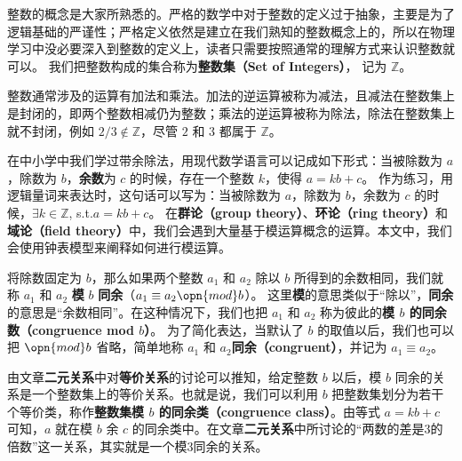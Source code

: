 


整数的概念是大家所熟悉的。严格的数学中对于整数的定义过于抽象，主要是为了逻辑基础的严谨性；严格定义依然是建立在我们熟知的整数概念上的，所以在物理学习中没必要深入到整数的定义上，读者只需要按照通常的理解方式来认识整数就可以。 我们把整数构成的集合称为\textbf{整数集（Set of Integers）}， 记为 $\mathbb{Z}$。

整数通常涉及的运算有加法和乘法。加法的逆运算被称为减法，且减法在整数集上是封闭的，即两个整数相减仍为整数；乘法的逆运算被称为除法，除法在整数集上就不封闭，例如 $2/3\not\in\mathbb{Z}$，尽管 $2$ 和 $3$ 都属于 $\mathbb{Z}$。

在中小学中我们学过带余除法，用现代数学语言可以记成如下形式：当被除数为 $a$，除数为 $b$，\textbf{余数}为 $c$ 的时候，存在一个整数 $k$，使得 $a=kb+c$。 作为练习，用逻辑量词来表达时，这句话可以写为：当被除数为 $a$，除数为 $b$，余数为 $c$ 的时候，$\exists k\in \mathbb{Z}$, s.t.$ a=kb+c$。 在\textbf{群论（group theory）}、\textbf{环论（ring theory）}和\textbf{域论（field theory）}中，我们会遇到大量基于模运算概念的运算。本文中，我们会使用钟表模型来阐释如何进行模运算。

将除数固定为 $b$，那么如果两个整数 $a_1$ 和 $a_2$ 除以 $b$ 所得到的余数相同，我们就称 $a_1$ 和 $a_2$ \textbf{模} $b$ \textbf{同余}（$a_1\equiv a_2 \opn{mod} b$）。 这里\textbf{模}的意思类似于“除以”，\textbf{同余}的意思是“余数相同”。在这种情况下，我们也把 $a_1$ 和 $a_2$ 称为彼此的\textbf{模 $b$ 的同余数（congruence mod $b$）}。 为了简化表达，当默认了 $b$ 的取值以后，我们也可以把 $\opn{mod} b$ 省略，简单地称 $a_1$ 和 $a_2$\textbf{同余（congruent）}，并记为 $a_1\equiv a_2$。 

由文章\textbf{二元关系}中对\textbf{等价关系}的讨论可以推知，给定整数 $b$ 以后，模 $b$ 同余的关系是一个整数集上的等价关系。也就是说，我们可以利用 $b$ 把整数集划分为若干个等价类，称作\textbf{整数集模 $b$ 的同余类（congruence class）}。由等式 $a=kb+c$ 可知，$a$ 就在模 $b$ 余 $c$ 的同余类中。在文章\textbf{二元关系}中所讨论的“两数的差是3的倍数”这一关系，其实就是一个模3同余的关系。



